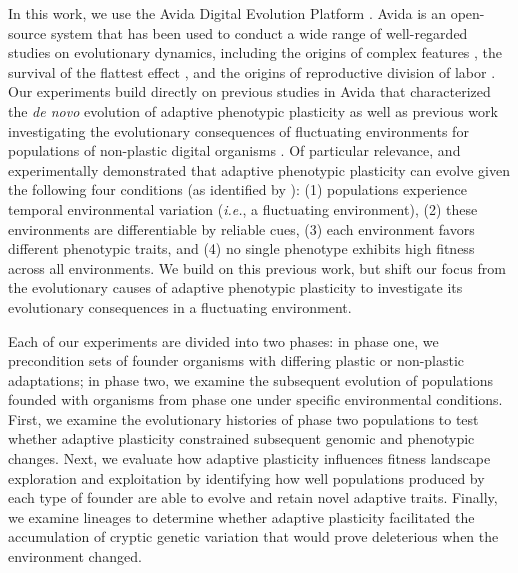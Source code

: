 In this work, we use the Avida Digital Evolution Platform \citep{ofria_avida:_2009}.
Avida is an open-source system that has been used to conduct a wide range of well-regarded studies on evolutionary dynamics, including 
the origins of complex features \citep{lenski_evolutionary_2003},
the survival of the flattest effect \citep{wilke_evolution_2001},
and the origins of reproductive division of labor \citep{goldsby_evolutionary_2014}.
Our experiments build directly on previous studies in Avida that characterized the \textit{de novo} evolution of adaptive phenotypic plasticity \citep{clune_investigating_2007,lalejini_evolutionary_2016} as well as previous work investigating the evolutionary consequences of fluctuating environments for populations of non-plastic digital organisms \citep{wilke_evolution_2001,canino-koning_fluctuating_2019}.
Of particular relevance, \cite{clune_investigating_2007} and \cite{lalejini_evolutionary_2016} experimentally demonstrated that adaptive phenotypic plasticity can evolve given the following four conditions (as identified by \cite{ghalambor_behavior_2010}):
(1) populations experience temporal environmental variation (\textit{i.e.}, a fluctuating environment),
(2) these environments are differentiable by reliable cues,
(3) each environment favors different phenotypic traits,
and (4) no single phenotype exhibits high fitness across all environments.
We build on this previous work, but shift our focus from the evolutionary causes of adaptive phenotypic plasticity to investigate its evolutionary consequences in a fluctuating environment.


Each of our experiments are divided into two phases: in phase one, we precondition sets of founder organisms with differing plastic or non-plastic adaptations;
in phase two, we examine the subsequent evolution of populations founded with organisms from phase one under specific environmental conditions. %
First, we examine the evolutionary histories of phase two populations to test whether adaptive plasticity constrained subsequent genomic and phenotypic changes. 
Next, we evaluate how adaptive plasticity influences fitness landscape exploration and exploitation by identifying how well populations produced by each type of founder are able to evolve and retain novel adaptive traits.
Finally, we examine lineages to determine whether adaptive plasticity facilitated the accumulation of cryptic genetic variation that would prove deleterious when the environment changed. %

